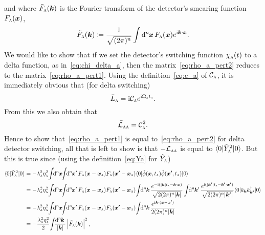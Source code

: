 \documentclass[pra,nofootinbib,floats,aps,twocolumn,tightenlines,superscriptaddress]{revtex4-1}
\renewcommand*\d[2][]{%
	\mathrm{d}%
	\ifx\relax#1\relax\else
	\rule{-0.02em}{1.5ex}^{#1}\rule{0.08em}{0ex}\!
	\fi
	#2\,
}
\newcommand{\ket}[1]{| {#1} \rangle}
\newcommand{\bra}[1]{\langle {#1} |}
\newcommand{\ii}{\mathrm{i}}
\renewcommand{\a}[1]{\hat{a}_{\bm{#1}}}
\newcommand{\ad}[1]{\hat{a}_{\bm{#1}}^\dagger}
\newcommand{\Ya}{\hat{Y}_\textsc{a}}
\newcommand{\ca}{\mathcal{C}_\textsc{a}}
\begin{document}
and where $\tilde{F}_\textsc{a}(\bm{k})$ is the Fourier transform of the detector's smearing function $F_\textsc{a}(\bm{x})$,
\begin{equation}
	\tilde{F}_\textsc{a}(\bm{k})
	\coloneqq
	\frac{1}{\sqrt{(2\pi)^n}}\int\d[n]{\bm{x}}
	F_\textsc{a}(\bm{x})e^{\ii\bm{k}\cdot\bm{x}}.
\end{equation}
We would like to show that if we set the detector's switching function $\chi_\textsc{a}(t)$ to a delta function, as in~\eqref{eq:chi_delta_a}, then the matrix~\eqref{eq:rho_a_pert2} reduces to the matrix~\eqref{eq:rho_a_pert1}. Using the definition~\eqref{eq:c_a} of $\ca$, it is immediately obvious that (for delta switching)
\begin{equation}
    \bar{L}_\textsc{a}
    =
    \ii\ca e^{\ii\Omega_\textsc{a}t_\textsc{a}}.
\end{equation}
From this we also obtain that
\begin{equation}
    \bar{\mathcal{L}}_\textsc{aa}=\ca^2.
\end{equation}
Hence to show that~\eqref{eq:rho_a_pert1} is equal to~\eqref{eq:rho_a_pert2} for delta detector switching, all that is left to show is that $-\mathcal{L}_\textsc{aa}$ is equal to $\bra{0}\Ya^2\ket{0}$. But this is true since (using the definition~\eqref{eq:Ya} for $\Ya$)
\begin{align}
    \bra{0}\Ya^2\ket{0}
    &=
    -\lambda_\textsc{a}^2
    \eta_\textsc{a}^2
    \!\int\!\!\d[n]{\bm x}\!\!\!
    \int\!\!\d[n]{\bm x'}
    F_\textsc{a}(\bm{x}-\bm{x}_\textsc{a})
    F_\textsc{a}(\bm{x'}-\bm{x}_\textsc{a})
    \bra{0}
    \hat{\phi}(\bm{x},t_\textsc{a})
    \hat{\phi}(\bm{x'},t_\textsc{a})
    \ket{0}
    \notag\\
    &=
    -\lambda_\textsc{a}^2
    \eta_\textsc{a}^2
    \!\int\!\!\d[n]{\bm x}\!\!\!
    \int\!\!\d[n]{\bm x'}
    F_\textsc{a}(\bm{x}-\bm{x}_\textsc{a})
    F_\textsc{a}(\bm{x'}-\bm{x}_\textsc{a})
    \!\int\!\!
    \d[n]{\bm k}
    \frac{e^{-\ii(|\bm{k}|t_\textsc{a}-\bm{k}\cdot\bm{x})}}{\sqrt{2(2\pi)^n|\bm{k}|}}
    \int\!\!
    \d[n]{\bm k'}
    \frac{e^{\ii(|\bm{k'}|t_\textsc{a}-\bm{k'}\cdot\bm{x'})}}{\sqrt{2(2\pi)^n|\bm{k'}|}}
    \bra{0}\a{k}\ad{k'}\ket{0}
    \notag\\
    &=
    -\lambda_\textsc{a}^2
    \eta_\textsc{a}^2
    \!\int\!\!\d[n]{\bm x}\!\!\!
    \int\!\!\d[n]{\bm x'}
    F_\textsc{a}(\bm{x}-\bm{x}_\textsc{a})
    F_\textsc{a}(\bm{x'}-\bm{x}_\textsc{a})
    \!\int\!\!
    \d[n]{\bm k}
    \frac{e^{\ii\bm{k}\cdot(\bm{x}-\bm{x'})}}{2(2\pi)^n|\bm{k}|}
    \notag\\
    &=
    -\frac{\lambda_\textsc{a}^2
    \eta_\textsc{a}^2}{2}
    \!\int\!\!
    \frac{\d[n]{\bm k}}{|\bm{k}|}
    \left| 
    \tilde{F}_\textsc{a}(\bm k)
    \right|^2,
\end{align}
\end{document}
